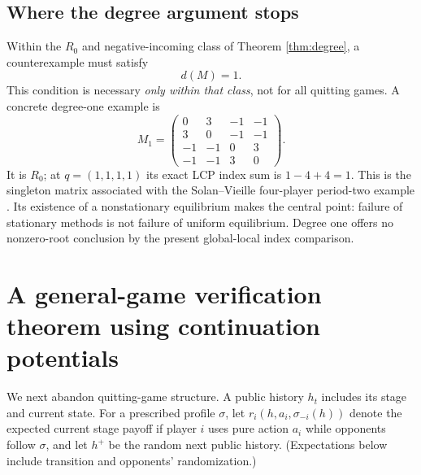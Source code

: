 \documentclass[11pt,a4paper]{article}
\theoremstyle{definition}
\theoremstyle{remark}
\begin{document}
\subsection{Where the degree argument stops}
Within the $R_0$ and negative-incoming class of Theorem \ref{thm:degree}, a counterexample must satisfy
\[
\boxed{d(M)=1.}
\]
This condition is necessary \emph{only within that class}, not for all quitting games. A concrete degree-one example is
\begin{equation}\label{eq:Mone}
M_1=\begin{pmatrix}
0&3&-1&-1\\3&0&-1&-1\\-1&-1&0&3\\-1&-1&3&0
\end{pmatrix}.
\end{equation}
It is $R_0$; at $q=(1,1,1,1)$ its exact LCP index sum is $1-4+4=1$. This is the singleton matrix associated with the Solan--Vieille four-player period-two example \cite{sv2002example}. Its existence of a nonstationary equilibrium makes the central point: failure of stationary methods is not failure of uniform equilibrium. Degree one offers no nonzero-root conclusion by the present global-local index comparison.

\section{A general-game verification theorem using continuation potentials}\label{sec:potential}
We next abandon quitting-game structure. A public history $h_t$ includes its stage and current state. For a prescribed profile $\sigma$, let $r_i(h,a_i,\sigma_{-i}(h))$ denote the expected current stage payoff if player $i$ uses pure action $a_i$ while opponents follow $\sigma$, and let $h^+$ be the random next public history. (Expectations below include transition and opponents' randomization.)
\end{document}
